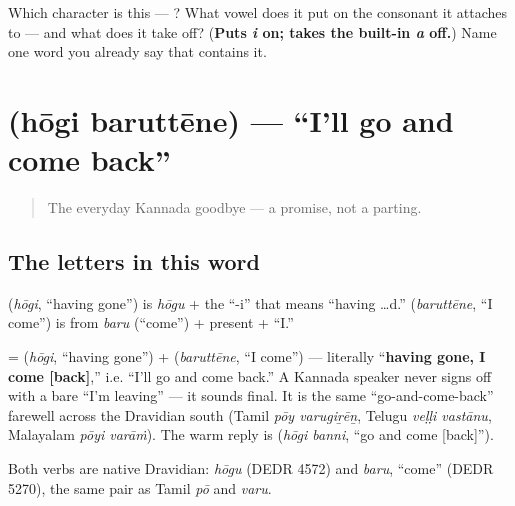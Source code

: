 \begin{tcolorbox}[breakable,colback=teal!4,colframe=teal!35!black,title={Before you move on}]
Which character is this — ? What vowel does it put on the consonant it attaches to — and what does it take off? (\textbf{Puts \emph{i} on; takes the built-in \emph{a} off.}) Name one word you already say that contains it.
\end{tcolorbox}
\section[\texorpdfstring{\kn{ಹೋಗಿ} \kn{ಬರುತ್ತೇನೆ} (hōgi baruttēne)}{ಹೋಗಿ ಬರುತ್ತೇನೆ (hōgi baruttēne)}]{  (hōgi baruttēne) — \textquotedblleft{}I'll go and come back\textquotedblright{}}

\label{lesson:KA-C04-hoogi-baruttene}



\begin{quote}
The everyday Kannada goodbye — a promise, not a parting.
\end{quote}

\subsection*{The letters in this word}
\textbf{} (\emph{hōgi}, \textquotedblleft{}having gone\textquotedblright{}) is \emph{hōgu} + the \textquotedblleft{}-i\textquotedblright{} that means \textquotedblleft{}having …d.\textquotedblright{} \textbf{} (\emph{baruttēne}, \textquotedblleft{}I come\textquotedblright{}) is from \emph{baru} (\textquotedblleft{}come\textquotedblright{}) + present + \textquotedblleft{}I.\textquotedblright{}

\begin{cousinweb}
\textbf{ } = \textbf{} (\emph{hōgi}, \textquotedblleft{}having gone\textquotedblright{}) + \textbf{} (\emph{baruttēne}, \textquotedblleft{}I come\textquotedblright{}) — literally \textquotedblleft{}\textbf{having gone, I come {[}back{]}},\textquotedblright{} i.e. \textquotedblleft{}I'll go and come back.\textquotedblright{} A Kannada speaker never signs off with a bare \textquotedblleft{}I'm leaving\textquotedblright{} — it sounds final. It is the same \textquotedblleft{}go-and-come-back\textquotedblright{} farewell across the Dravidian south (Tamil \emph{pōy varugiṟēṉ}, Telugu \emph{veḷḷi vastānu}, Malayalam \emph{pōyi varāṁ}). The warm reply is \textbf{ } (\emph{hōgi banni}, \textquotedblleft{}go and come {[}back{]}\textquotedblright{}).

Both verbs are native Dravidian: \emph{hōgu} (DEDR 4572) and \emph{baru}, \textquotedblleft{}come\textquotedblright{} (DEDR 5270), the same pair as Tamil \emph{pō} and \emph{varu}.
\end{cousinweb}

